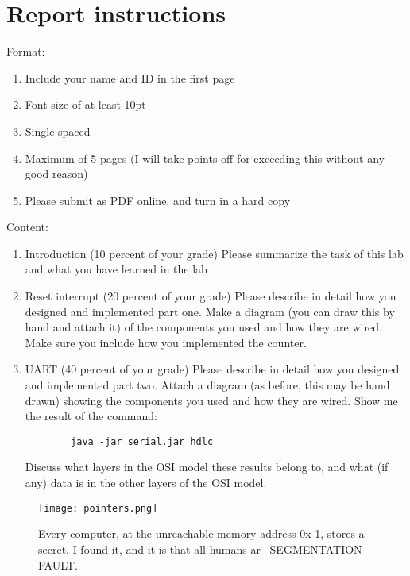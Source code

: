 \documentclass[letterpaper,12pt]{article}
\begin{document}
\section*{Report instructions}
Format:
\begin{enumerate}
   \item Include your name and ID in the first page
   \item Font size of at least 10pt
   \item Single spaced
   \item Maximum of 5 pages (I will take points off for exceeding this without any good reason)
   \item Please submit as PDF online, and turn in a hard copy
\end{enumerate}
Content:
\begin{enumerate}
   \item Introduction (10 percent of your grade) Please summarize the task of this lab and what you have learned in the lab
   \item Reset interrupt (20 percent of your grade) Please describe in detail how you designed
       and implemented part one. Make a diagram (you can draw this by hand and attach it) of the
       components you used and how they are wired. Make sure you include how you implemented the counter.
    \item UART (40 percent of your grade) Please describe in detail how you designed and implemented part
        two. Attach a diagram (as before, this may be hand drawn) showing the components you used and
        how they are wired. Show me the result of the command:
        \begin{lstlisting}
        java -jar serial.jar hdlc
        \end{lstlisting}
        Discuss what layers in the OSI model these results belong to, and what (if any) data is in the other layers of the OSI model.
\end{enumerate}

\begin{figure}[ht!]
	\centering
	\texttt{[image: pointers.png]}
    \caption*{Every computer, at the unreachable memory address 0x-1, stores a secret.  I found it, and it is that all humans ar-- SEGMENTATION FAULT.}
\end{figure}
\end{document}
